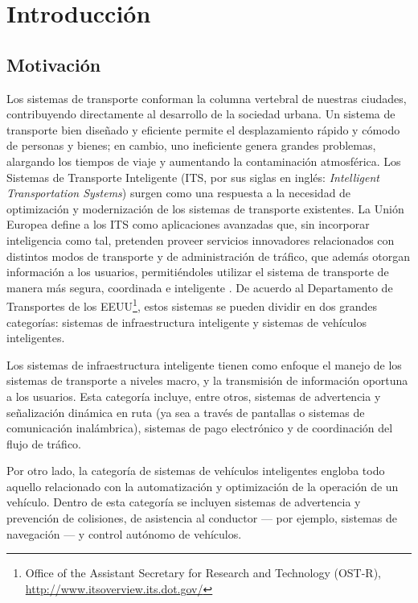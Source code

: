 \chapter{Introducción}
\section{Motivación}

Los sistemas de transporte conforman la columna vertebral de nuestras ciudades, contribuyendo directamente al desarrollo de la sociedad urbana. Un sistema de transporte bien diseñado y eficiente permite el desplazamiento rápido y cómodo de personas y bienes; en cambio, uno ineficiente genera grandes problemas, alargando los tiempos de viaje y aumentando la contaminación atmosférica.
Los Sistemas de Transporte Inteligente (ITS, por sus siglas en inglés: \textit{Intelligent Transportation Systems}) surgen como una respuesta a la necesidad de optimización y modernización de los sistemas de transporte existentes. La Unión Europea define a los ITS como aplicaciones avanzadas que, sin incorporar inteligencia como tal, pretenden proveer servicios innovadores relacionados con distintos modos de transporte y de administración de tráfico, que además otorgan información a los usuarios, permitiéndoles utilizar el sistema de transporte de manera más segura, coordinada e inteligente \autocite{eudirective}. De acuerdo al Departamento de Transportes de los EEUU\footnote{Office of the Assistant Secretary for Research and Technology (OST-R), \url{http://www.itsoverview.its.dot.gov/}}, estos sistemas se pueden dividir en dos grandes categorías: sistemas de infraestructura inteligente y sistemas de vehículos inteligentes.

Los sistemas de infraestructura inteligente tienen como enfoque el manejo de los sistemas de transporte a niveles macro, y la transmisión de información oportuna a los usuarios. Esta categoría incluye, entre otros, sistemas de advertencia y señalización dinámica en ruta (ya sea a través de pantallas o sistemas de comunicación inalámbrica), sistemas de pago electrónico y de coordinación del flujo de tráfico.

Por otro lado, la categoría de sistemas de vehículos inteligentes engloba todo aquello relacionado con la automatización y optimización de la operación de un vehículo. Dentro de esta categoría se incluyen sistemas de advertencia y prevención de colisiones, de asistencia al conductor --- por ejemplo, sistemas de navegación --- y control autónomo de vehículos.

